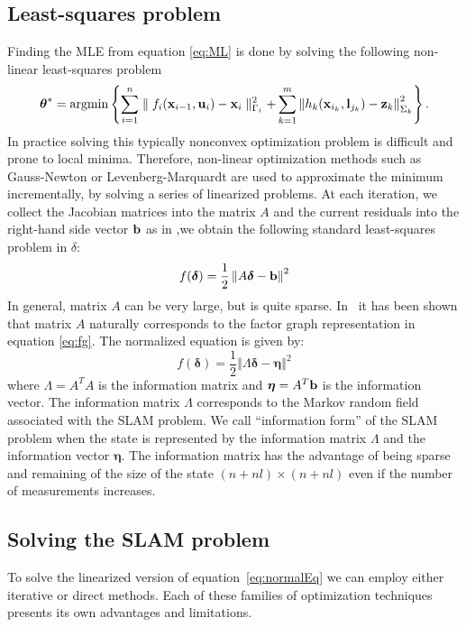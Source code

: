 \documentclass{article}
\newcommand{\argmin}{\operatornamewithlimits{argmin}}
\begin{document}
{\subsection{Least-squares problem}\label{subsec:solveSLAM}
Finding the MLE from equation \ref{eq:ML} is done by solving the following non-linear least-squares problem
%
\begin{equation}
\boldsymbol{\theta}^{*}=\argmin \left\{\sum_{i=1}^{n}\parallel f_{i}({\bf x}_{i-1},{\bf u}_{i}) -{\bf x}_{i}\parallel_{\Gamma_{i}}^{2} + \sum_{k=1}^{m}\left\Vert h_{k}({\bf x}_{i_{k}},{\bf l}_{j_{k}})-{\bf z}_{k}\right\Vert _{\Sigma_{k}}^{2} \right \}.
\label{eq:nlls}
\end{equation}
In practice solving this typically nonconvex optimization problem is difficult and prone to local minima. Therefore, non-linear optimization methods such as Gauss-Newton or Levenberg-Marquardt are used to approximate the minimum incrementally, by solving a series of linearized problems. At each iteration, we collect the Jacobian matrices into the matrix $A$ and the current residuals into the right-hand side vector ${\bf b}$ as in \cite{Dellaert06ijrr} ,we obtain the following standard least-squares problem in $\delta$: 
%
\begin{equation}
f(\boldsymbol{\delta})=\frac{1}{2}\left\Vert A\boldsymbol{\delta}-{\bf b}\right\Vert ^{2}
\label{eq:linearEq}
\end{equation}
%
In general, matrix $A$  can be very large, but is quite sparse. In~\cite{Dellaert06ijrr,Kaess08tro} it has been shown that matrix $A$  naturally corresponds to the factor graph representation in equation \ref{eq:fg}. The normalized equation is given by:
%
\begin{equation}
f(\boldsymbol{\delta})=\frac{1}{2}\left\Vert \Lambda\boldsymbol{\delta}-{\boldsymbol \eta}\right\Vert ^{2} 
\label{eq:normalEq}
\end{equation}
%
where $\Lambda=A^{T}A$  is the information matrix and ${\boldsymbol \eta}=A^{T} {\bf b}$  is the information vector. The information matrix $\Lambda$ corresponds to the Markov random field associated with the SLAM problem. We call ``information form'' of the SLAM problem when the state is represented by the information matrix $\Lambda$ and the information vector ${\boldsymbol \eta}$. The information matrix has the advantage of being sparse and remaining of the size of the state $(n+nl)\times (n+nl)$ even if the number of measurements increases.

\subsection{Solving the SLAM problem}\label{subsec:solveSLAM}
To solve the linearized version of equation~\ref{eq:normalEq} we can employ either iterative or direct methods. Each of these families of optimization techniques presents its own advantages and limitations.
}
\end{document}
